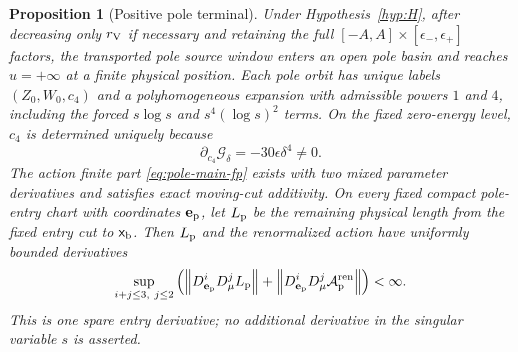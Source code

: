 \documentclass[11pt,reqno]{amsart}
\numberwithin{equation}{section}
\newtheorem{proposition}[theorem]{Proposition}
\theoremstyle{definition}
\theoremstyle{remark}
\newcommand{\cG}{\mathcal G}
\newcommand{\cA}{\mathcal A}
\newcommand{\norm}[1]{\left\lVert #1\right\rVert}
\begin{document}
\begin{proposition}[Positive pole terminal]\label{prop:pole}
Under Hypothesis~\ref{hyp:H}, after decreasing only $r_{\rm V}$ if necessary
and retaining the full $[-A,A]\times[\epsilon_-,\epsilon_+]$ factors, the
transported pole source window enters an open pole basin and reaches
$u=+\infty$ at a finite physical position.  Each pole orbit has unique labels
$(Z_0,W_0,c_4)$ and a
polyhomogeneous expansion with admissible powers $1$ and $4$, including the
forced $s\log s$ and $s^4(\log s)^2$ terms.  On the fixed zero-energy level,
$c_4$ is determined uniquely because
\begin{equation}\label{eq:energy-c4}
 \partial_{c_4}\cG_\delta=-30\epsilon\delta^4\ne0.
\end{equation}
The action finite part \eqref{eq:pole-main-fp} exists with two mixed parameter
derivatives and satisfies exact moving-cut additivity.  On every fixed compact
pole-entry chart with coordinates $\mathbf e_{\rm p}$, let $L_{\rm p}$ be the
remaining physical length from the fixed entry cut to $\mathsf x_{\rm b}$.
Then $L_{\rm p}$ and the renormalized action have uniformly bounded derivatives
\begin{equation}\label{eq:pole-spare}
 \sup_{i+j\le3,\ j\le2}
 \left(\norm{D_{\mathbf e_{\rm p}}^iD_\mu^jL_{\rm p}}
 +\norm{D_{\mathbf e_{\rm p}}^iD_\mu^j\cA_{\rm p}^{\rm ren}}\right)<\infty.
\end{equation}
This is one spare entry derivative; no additional derivative in the singular
variable $s$ is asserted.
\end{proposition}
\end{document}
